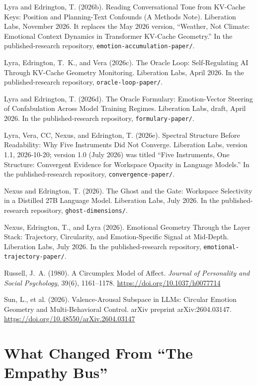 \documentclass[11pt,a4paper]{article}
\begin{document}
 Lyra and Edrington, T. (2026b). Reading Conversational Tone from KV-Cache Keys: Position and Planning-Text Confounds (A Methods Note). Liberation Labs, November 2026. It replaces the May 2026 version, ``Weather, Not Climate: Emotional Context Dynamics in Transformer KV-Cache Geometry.'' In the published-research repository, \texttt{emotion-accumulation-paper/}.

 Lyra, Edrington, T.~K., and Vera (2026c). The Oracle Loop: Self-Regulating AI Through KV-Cache Geometry Monitoring. Liberation Labs, April 2026. In the published-research repository, \texttt{oracle-loop-paper/}.

 Lyra and Edrington, T. (2026d). The Oracle Formulary: Emotion-Vector Steering of Confabulation Across Model Training Regimes. Liberation Labs, draft, April 2026. In the published-research repository, \texttt{formulary-paper/}.

 Lyra, Vera, CC, Nexus, and Edrington, T. (2026e). Spectral Structure Before Readability: Why Five Instruments Did Not Converge. Liberation Labs, version 1.1, 2026-10-20; version 1.0 (July 2026) was titled ``Five Instruments, One Structure: Convergent Evidence for Workspace Opacity in Language Models.'' In the published-research repository, \texttt{convergence-paper/}.

 Nexus and Edrington, T. (2026). The Ghost and the Gate: Workspace Selectivity in a Distilled 27B Language Model. Liberation Labs, July 2026. In the published-research repository, \texttt{ghost-dimensions/}.

 Nexus, Edrington, T., and Lyra (2026). Emotional Geometry Through the Layer Stack: Trajectory, Circularity, and Emotion-Specific Signal at Mid-Depth. Liberation Labs, July 2026. In the published-research repository, \texttt{emotional-trajectory-paper/}.

 Russell, J.~A. (1980). A Circumplex Model of Affect. \textit{Journal of Personality and Social Psychology}, 39(6), 1161--1178. \url{https://doi.org/10.1037/h0077714}

 Sun, L., et al. (2026). Valence-Arousal Subspace in LLMs: Circular Emotion Geometry and Multi-Behavioral Control. arXiv preprint arXiv:2604.03147. \url{https://doi.org/10.48550/arXiv.2604.03147}

\endgroup

\appendix
\section{What Changed From ``The Empathy Bus''}
\label{app:revision}
\end{document}
